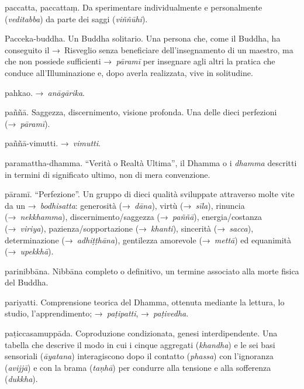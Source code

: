 \begin{glossarydescription}
\item[paccatta, paccattaṃ.] Da sperimentare individualmente e
  personalmente (\emph{veditabba}) da parte dei saggi (\emph{viññūhi}).

\item[Pacceka-buddha.] Un Buddha solitario. Una persona che, come il
  Buddha, ha conseguito il →~Risveglio senza beneficiare dell'insegnamento di un
  maestro, ma che non possiede sufficienti →~\emph{pāramī} per insegnare agli
  altri la pratica che conduce all'Illuminazione e, dopo averla realizzata, vive
  in solitudine.

\item[pahkao.] →~\emph{anāgārika}.

\item[paññā.] Saggezza, discernimento, visione profonda. Una delle dieci
  perfezioni (→~\emph{pāramī}).

\item[paññā-vimutti.] →~\emph{vimutti}.

\item[paramattha-dhamma.] ``Verità o Realtà Ultima'', il Dhamma o i
  \emph{dhamma} descritti in termini di significato ultimo, non di mera
  convenzione.

\item[pāramī.]\label{glossary-parami} ``Perfezione''. Un gruppo di dieci qualità sviluppate
  attraverso molte vite da un →~\emph{bodhisatta}: generosità (→~\emph{dāna}),
  virtù (→~\emph{sīla}), rinuncia (→~\emph{nekkhamma}), discernimento/saggezza
  (→~\emph{paññā}), energia/costanza (→~\emph{viriya}), pazienza/sopportazione
  (→~\emph{khanti}), sincerità (→~\emph{sacca}), determinazione
  (→~\emph{adhiṭṭhāna}), gentilezza amorevole (→~\emph{mettā}) ed equanimità
  (→~\emph{upekkhā}).

\item[parinibbāna.] Nibbāna completo o definitivo, un termine
  associato alla morte fisica del Buddha.

\item[pariyatti.] Comprensione teorica del Dhamma, ottenuta mediante la
  lettura, lo studio, l'apprendimento; →~\emph{paṭipatti}, →~\emph{paṭivedha}.

\item[paṭiccasamuppāda.] Coproduzione condizionata, genesi
  interdipendente. Una tabella che descrive il modo in cui i cinque aggregati
  (\emph{khandha}) e le sei basi sensoriali (\emph{āyatana}) interagiscono dopo
  il contatto (\emph{phassa}) con l'ignoranza (\emph{avijjā}) e con la brama
  (\emph{taṇhā}) per condurre alla tensione e alla sofferenza (\emph{dukkha}).


\end{glossarydescription}
